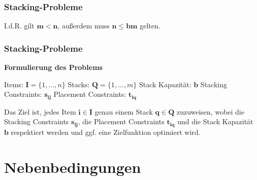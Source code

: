\documentclass{beamer}
\begin{document}
\begin{frame}
\frametitle{Stacking-Probleme}
\begin{figure}[H]
\centering
{}
\end{figure}
\centering
I.d.R. gilt $\boldsymbol{m} < \boldsymbol{n}$, außerdem muss $\boldsymbol{n} \leq \boldsymbol{bm}$ gelten.
\end{frame}

\begin{frame}
\frametitle{Stacking-Probleme}

\textbf{Formulierung des Problems}\newline

Items: $\boldsymbol{I} = \{1, ..., n\}$\newline
Stacks: $\boldsymbol{Q} = \{1, ..., m\}$\newline
Stack Kapazität: $\boldsymbol{b}$\newline
Stacking Constraints: $\boldsymbol{s_{ij}}$\newline
Placement Constraints: $\boldsymbol{t_{iq}}$\newline

Das Ziel ist, jedes Item $\boldsymbol{i} \in \boldsymbol{I}$ genau einem Stack $\boldsymbol{q} \in \boldsymbol{Q}$ zuzuweisen,
wobei die Stacking Constraints $\boldsymbol{s_{ij}}$, die Placement Constraints $\boldsymbol{t_{iq}}$ und die Stack Kapazität $\boldsymbol{b}$ respektiert werden und ggf. eine Zielfunktion optimiert wird.
\end{frame}

\section{Nebenbedingungen}
\end{document}
